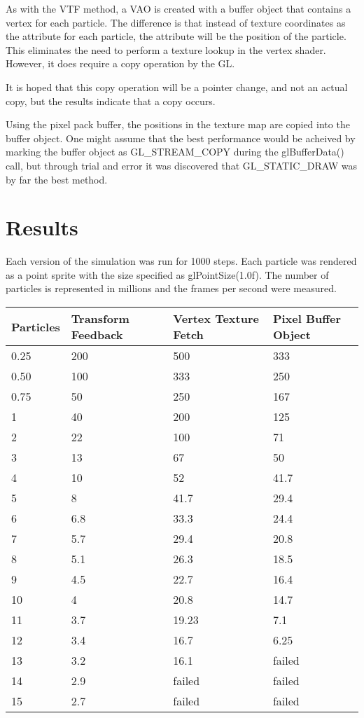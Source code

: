 \documentclass{article}
\begin{document}
As with the VTF method, a VAO is created with a buffer object
that contains a vertex for each particle. The difference is that
instead of texture coordinates as the attribute for each particle,
the attribute will be the position of the particle. This eliminates
the need to perform a texture lookup in the vertex shader. However,
it does require a copy operation by the GL.

It is hoped that this copy operation will be a pointer change, and
not an actual copy, but the results indicate that a copy occurs.

Using the pixel pack buffer, the positions in the texture map
are copied into the buffer object. One might assume that the
best performance would be acheived by marking the buffer object
as GL\_STREAM\_COPY during the glBufferData() call, but through trial
and error it was discovered that GL\_STATIC\_DRAW was by far the
best method.


\section{Results}

Each version of the simulation was run for 1000 steps. Each particle was rendered as 
a point sprite with the size specified as glPointSize(1.0f). The number of particles is represented in millions and the frames per second were measured.

\begin{tabular}{llll}
Particles	&	Transform Feedback		& Vertex Texture Fetch &	Pixel Buffer Object \\
\hline
0.25		&	200	&	500	&	333 \\
0.50		&	100	&	333	& 	250 \\
0.75		&	50		&  250	&	167	\\
1			&  40		&  200	&	125	\\
2			&  22		&  100	&	71 	\\
3			& 13		&   67    &	50		\\
4            & 10		&   52	&	41.7	\\
5			&  8		&	41.7	&	29.4	\\
6			&  6.8	&	33.3	&	24.4	\\
7			&	5.7	&	29.4	&	20.8	\\
8			&	5.1	&	26.3	&	18.5	\\
9			&	4.5	&	22.7	&	16.4	\\
10			&	4		&	20.8	&	14.7	\\
11			&	3.7	&	19.23	&	7.1	\\
12			&	3.4	&	16.7		&	6.25	\\
13			&	3.2	&	16.1		&  failed	\\
14			&	2.9	&	failed	&	failed	\\
15			&	2.7	&	failed	&	failed	\\
\end{tabular}
\end{document}
